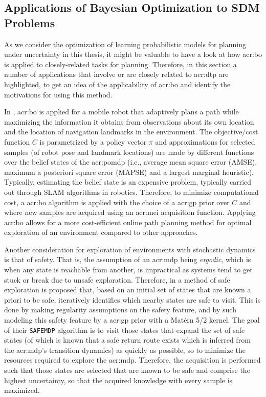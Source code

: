\subsection{Applications of Bayesian Optimization to SDM Problems}
\label{sec:bayesian-optimization-applications}

As we consider the optimization of learning probabilistic models for planning under uncertainty in this thesis, it might be valuable to have a look at how \acrlong{acr:bo} is applied to closely-related tasks for planning. %
Therefore, in this section a number of applications that involve or are closely related to \acrshort{acr:dtp} are highlighted, to get an idea of the applicability of \acrlong{acr:bo} and identify the motivations for using this method.

In \cite{MartinezCantin2009}, \acrlong{acr:bo} is applied for a mobile robot that adaptively plans a path while maximizing the information it obtains from observations about its own location and the location of navigation landmarks in the environment.
The objective/cost function $C$ is parametrized by a policy vector $\pi$ and approximations for selected samples (of robot pose and landmark locations) are made by different functions over the belief states of the \acrshort{acr:pomdp} (i.e., average mean square error (AMSE), maximum a posteriori square error (MAPSE) and a largest marginal heuristic).
Typically, estimating the belief state is an expensive problem, typically carried out through SLAM algorithms in robotics.
Therefore, to minimize computational cost, a \acrlong{acr:bo} algorithm is applied with the choice of a \acrshort{acr:gp} prior over $C$ and where new samples are acquired using an \acrshort{acr:mei} acquisition function.
Applying \acrlong{acr:bo} allows for a more cost-efficient online path planning method for optimal exploration of an environment compared to other approaches.

Another consideration for exploration of environments with stochastic dynamics is that of safety. That is, the assumption of an \acrshort{acr:mdp} being \textit{ergodic}, which is when any state is reachable from another, is impractical as systems tend to get stuck or break due to unsafe exploration. 
Therefore, in \cite{turchetta2016safe} a method of safe exploration is proposed that, based on an initial set of states that are known a priori to be safe, iteratively identifies which nearby states are safe to visit.
This is done by making regularity assumptions on the safety feature, and by such modeling this safety feature by a \acrshort{acr:gp} prior with a Mat\'ern 5/2 kernel.
The goal of their \texttt{SAFEMDP} algorithm is to visit those states that expand the set of safe states (of which is known that a safe return route exists which is inferred from the \acrshort{acr:mdp}'s transition dynamics) as quickly as possible, so to minimize the resources required to explore the \acrshort{acr:mdp}.
Therefore, the acquisition is performed such that those states are selected that are known to be safe and comprise the highest uncertainty, so that the acquired knowledge with every sample is maximized.

